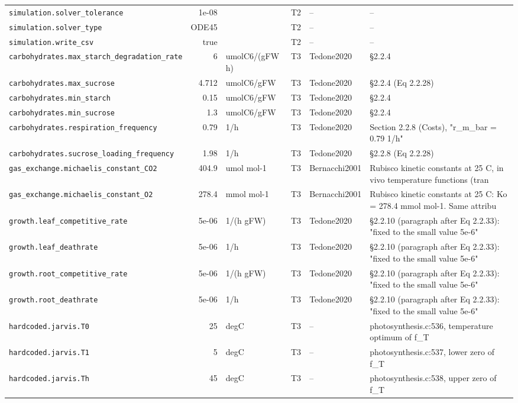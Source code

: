 \begin{table}[!htbp]
\begin{tabular}{@{}p{52mm}rp{20mm}cp{20mm}p{38mm}@{}}
\texttt{simulation.solver\_tolerance} & 1e-08 &  & T2 & -- & -- \\
\texttt{simulation.solver\_type} & ODE45 &  & T2 & -- & -- \\
\texttt{simulation.write\_csv} & true &  & T2 & -- & -- \\
\texttt{carbohydrates.max\_starch\_degradation\_rate} & 6 & umolC6/(gFW h) & T3 & Tedone2020 & §2.2.4 \\
\texttt{carbohydrates.max\_sucrose} & 4.712 & umolC6/gFW & T3 & Tedone2020 & §2.2.4 (Eq 2.2.28) \\
\texttt{carbohydrates.min\_starch} & 0.15 & umolC6/gFW & T3 & Tedone2020 & §2.2.4 \\
\texttt{carbohydrates.min\_sucrose} & 1.3 & umolC6/gFW & T3 & Tedone2020 & §2.2.4 \\
\texttt{carbohydrates.respiration\_frequency} & 0.79 & 1/h & T3 & Tedone2020 & Section 2.2.8 (Costs), "r\_m\_bar = 0.79 1/h" \\
\texttt{carbohydrates.sucrose\_loading\_frequency} & 1.98 & 1/h & T3 & Tedone2020 & §2.2.8 (Eq 2.2.28) \\
\texttt{gas\_exchange.michaelis\_constant\_CO2} & 404.9 & umol mol-1 & T3 & Bernacchi2001 & Rubisco kinetic constants at 25 C, in vivo temperature functions (tran \\
\texttt{gas\_exchange.michaelis\_constant\_O2} & 278.4 & mmol mol-1 & T3 & Bernacchi2001 & Rubisco kinetic constants at 25 C: Ko = 278.4 mmol mol-1. Same attribu \\
\texttt{growth.leaf\_competitive\_rate} & 5e-06 & 1/(h gFW) & T3 & Tedone2020 & §2.2.10 (paragraph after Eq 2.2.33): "fixed to the small value 5e-6" \\
\texttt{growth.leaf\_deathrate} & 5e-06 & 1/h & T3 & Tedone2020 & §2.2.10 (paragraph after Eq 2.2.33): "fixed to the small value 5e-6" \\
\texttt{growth.root\_competitive\_rate} & 5e-06 & 1/(h gFW) & T3 & Tedone2020 & §2.2.10 (paragraph after Eq 2.2.33): "fixed to the small value 5e-6" \\
\texttt{growth.root\_deathrate} & 5e-06 & 1/h & T3 & Tedone2020 & §2.2.10 (paragraph after Eq 2.2.33): "fixed to the small value 5e-6" \\
\texttt{hardcoded.jarvis.T0} & 25 & degC & T3 & -- & photosynthesis.c:536, temperature optimum of f\_T \\
\texttt{hardcoded.jarvis.T1} & 5 & degC & T3 & -- & photosynthesis.c:537, lower zero of f\_T \\
\texttt{hardcoded.jarvis.Th} & 45 & degC & T3 & -- & photosynthesis.c:538, upper zero of f\_T \\

\end{tabular}
\end{table}
